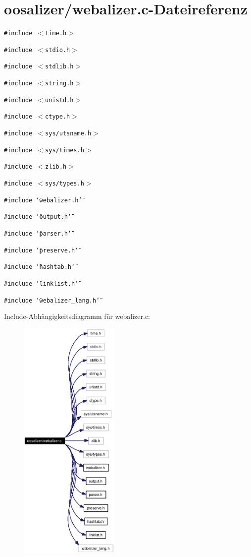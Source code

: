 \section{oosalizer/webalizer.c-Dateireferenz}
\label{webalizer_8c}
{\tt \#include $<$time.h$>$}\par
{\tt \#include $<$stdio.h$>$}\par
{\tt \#include $<$stdlib.h$>$}\par
{\tt \#include $<$string.h$>$}\par
{\tt \#include $<$unistd.h$>$}\par
{\tt \#include $<$ctype.h$>$}\par
{\tt \#include $<$sys/utsname.h$>$}\par
{\tt \#include $<$sys/times.h$>$}\par
{\tt \#include $<$zlib.h$>$}\par
{\tt \#include $<$sys/types.h$>$}\par
{\tt \#include \char`\"{}webalizer.h\char`\"{}}\par
{\tt \#include \char`\"{}output.h\char`\"{}}\par
{\tt \#include \char`\"{}parser.h\char`\"{}}\par
{\tt \#include \char`\"{}preserve.h\char`\"{}}\par
{\tt \#include \char`\"{}hashtab.h\char`\"{}}\par
{\tt \#include \char`\"{}linklist.h\char`\"{}}\par
{\tt \#include \char`\"{}webalizer\_\-lang.h\char`\"{}}\par


Include-Abh\"{a}ngigkeitsdiagramm f\"{u}r webalizer.c:\begin{figure}[H]
\begin{center}
\leavevmode
\includegraphics[width=137pt]{webalizer_8c__incl}
\end{center}
\end{figure}
